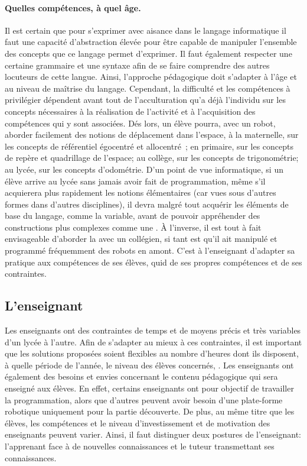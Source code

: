         \paragraph{Quelles compétences, à quel âge.}
            Il est certain que pour s'exprimer avec aisance dans le langage informatique  il faut une capacité d'abstraction élevée pour être capable de manipuler l'ensemble des concepts que ce langage permet d'exprimer. Il faut également respecter une certaine grammaire et une syntaxe afin de se faire comprendre des autres locuteurs de cette langue. Ainsi, l'approche pédagogique doit s'adapter à l'âge et au niveau de maîtrise du langage. Cependant, la difficulté et les compétences à privilégier dépendent avant tout de l'acculturation qu'a déjà l'individu sur les concepts nécessaires à la réalisation de l'activité et à l'acquisition des compétences qui y sont associées.%
            Dés lors, un élève pourra, avec un robot, aborder facilement des notions de déplacement dans l'espace, à la maternelle, sur les concepts de référentiel égocentré et allocentré~; en primaire, sur les concepts de repère et quadrillage de l'espace; au collège, sur les concepts de trigonométrie; au lycée, sur les concepts d'odométrie.%
            D'un point de vue informatique, si un élève arrive au lycée sans jamais avoir fait de programmation, même s'il acquierera plus rapidement les notions élémentaires (car vues sous d'autres formes dans d'autres disciplines), il devra malgré tout acquérir les éléments de base du langage, comme la variable, avant de pouvoir appréhender des constructions plus complexes comme une . À l'inverse, il est tout à fait envisageable d'aborder la  avec un collégien, si tant est qu'il ait manipulé et programmé fréquemment des robots en amont.%
            C'est à l'enseignant d'adapter sa pratique aux compétences de ses élèves, quid de ses propres compétences et de ses contraintes. 
    \subsection{L'enseignant}
        Les enseignants ont des contraintes de temps et de moyens précis et très variables d’un lycée à l’autre. Afin de s’adapter au mieux à ces contraintes, il est important que les solutions proposées soient flexibles au nombre d’heures dont ils disposent, à quelle période de l’année, le niveau des élèves concernés, \etc.%
        Les enseignants ont également des besoins et envies concernant le contenu pédagogique qui sera enseigné aux élèves. En effet, certains enseignants ont pour objectif de travailler la programmation, alors que d’autres peuvent avoir besoin d'une plate-forme robotique uniquement pour la partie découverte. De plus, au même titre que les élèves, les compétences et le niveau d’investissement et de motivation des enseignants peuvent varier. Ainsi, il faut distinguer deux postures de l'enseignant: l'apprenant face à de nouvelles connaissances et le tuteur transmettant ses connaissances.
